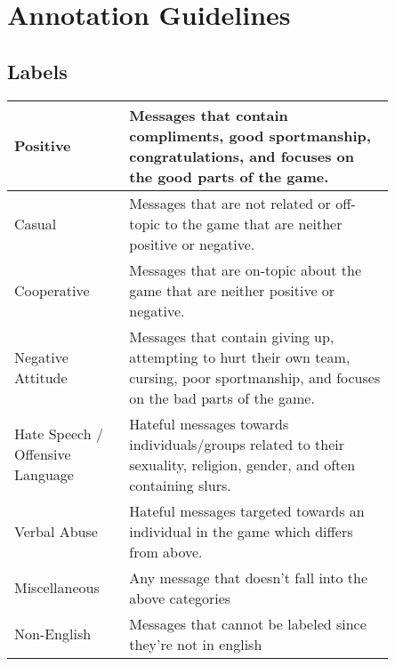\documentclass[11pt, letterpaper, notitlepage]{article}
\begin{document}
\newpage

\section[2]{Annotation Guidelines}

\subsection{Labels}
\begin{table}[h]
    \begin{tabular}{p{0.25\linewidth} | p{0.6\linewidth}}
        \hline
    Positive                       & Messages that contain compliments, good sportmanship, congratulations, and focuses on the good parts of the game.                         \\ \hline
    Casual                         & Messages that are not related or off-topic to the game that are neither positive or negative.                                             \\ \hline
    Cooperative                    & Messages that are on-topic about the game that are neither positive or negative.                                                          \\ \hline
    Negative Attitude              & Messages that contain giving up, attempting to hurt their own team, cursing, poor sportmanship, and focuses on the bad parts of the game. \\ \hline
    Hate Speech / Offensive Language & Hateful messages towards individuals/groups related to their sexuality, religion, gender, and often containing slurs.                     \\ \hline
    Verbal Abuse                   & Hateful messages targeted towards an individual in the game which differs from above.                                                     \\ \hline
    Miscellaneous                  & Any message that doesn't fall into the above categories       \\      \hline
    Non-English                    & Messages that cannot be labeled since they're not in english \\                                                                       
    \hline                                                                                                                              
    \end{tabular}
    \end{table}
\end{document}

